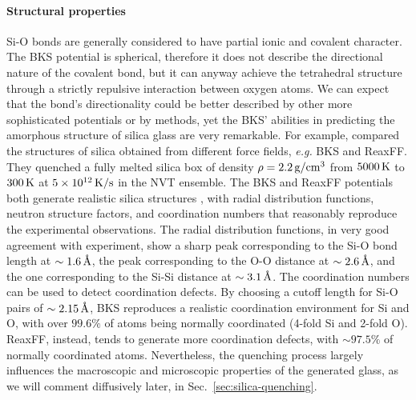 \paragraph{Structural properties}
Si-O bonds are generally considered to have partial ionic and covalent character. The BKS potential is spherical, therefore it does not describe the directional nature of the covalent bond, but it can anyway achieve the tetrahedral structure through a strictly repulsive interaction between oxygen atoms. We can expect that the bond's directionality could be better described by other more sophisticated potentials or by \abinitio methods, yet the BKS' abilities in predicting the amorphous structure of silica glass are very remarkable. 
For example, \citet{Tian2017} compared the structures of silica obtained from different force fields, \emph{e.g.} BKS and ReaxFF. They quenched a fully melted silica box of density $\rho=2.2\,\mathrm{g/cm^3}$ from $5000\,\mathrm{K}$ to $300\,\mathrm{K}$ at $5\times 10^{12}\,\mathrm{K/s}$ in the NVT ensemble. 
The BKS and ReaxFF potentials both generate realistic silica structures \cite{Vollmayr1996,Yuan2001}, with radial distribution functions, neutron structure factors, and coordination numbers that reasonably reproduce the experimental observations.
The radial distribution functions, in very good agreement with experiment, show a sharp peak corresponding to the Si-O bond length at $\sim 1.6\,\mathrm{{\mbox{\AA}}}$, the peak corresponding to the O-O distance at $\sim 2.6\,\mathrm{{\mbox{\AA}}}$, and the one corresponding to the Si-Si distance at $\sim 3.1\,\mathrm{{\mbox{\AA}}}$. 
The coordination numbers can be used to detect coordination defects. By choosing a cutoff length for Si-O pairs of $\sim 2.15\,\mathrm{{\mbox{\AA}}}$, BKS reproduces a realistic coordination environment for Si and O, with over $99.6\%$ of atoms being normally coordinated (4-fold Si and 2-fold O). ReaxFF, instead, tends to generate more coordination defects, with $\sim 97.5\%$ of normally coordinated atoms.
Nevertheless, the quenching process largely influences the macroscopic and microscopic properties of the generated glass, as we will comment diffusively later, in Sec.~\ref{sec:silica-quenching}. 


